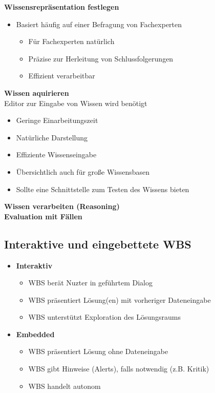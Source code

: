 \documentclass[14pt]{article}
\begin{document}
\textbf{Wissensrepräsentation festlegen} \\
\begin{itemize}
    \item Basiert häufig auf einer Befragung von Fachexperten
          \begin{itemize}
              \item Für Fachexperten natürlich
              \item Präzise zur Herleitung von Schlussfolgerungen
              \item Effizient verarbeitbar
          \end{itemize}
\end{itemize}
\textbf{Wissen aquirieren} \\
Editor zur Eingabe von Wissen wird benötigt
\begin{itemize}
    \item Geringe Einarbeitungszeit
    \item Natürliche Darstellung
    \item Effiziente Wissenseingabe
    \item Übersichtlich auch für große Wissensbasen
    \item Sollte eine Schnittstelle zum Testen des Wissens bieten
\end{itemize}
\textbf{Wissen verarbeiten (Reasoning)} \\
\textbf{Evaluation mit Fällen}

\subsection{Interaktive und eingebettete WBS}
\begin{itemize}
    \item \textbf{Interaktiv}
          \begin{itemize}
              \item WBS berät Nuzter in geführtem Dialog
              \item WBS präsentiert Lösung(en) mit vorheriger
                    Dateneingabe
              \item WBS unterstützt Exploration des Lösungsraums
          \end{itemize}
    \item \textbf{Embedded}
          \begin{itemize}
              \item WBS präsentiert Lösung ohne Dateneingabe
              \item WBS gibt Hinweise (Alerts), falls notwendig
                    (z.B. Kritik)
              \item WBS handelt autonom
          \end{itemize}
\end{itemize}
\end{document}
